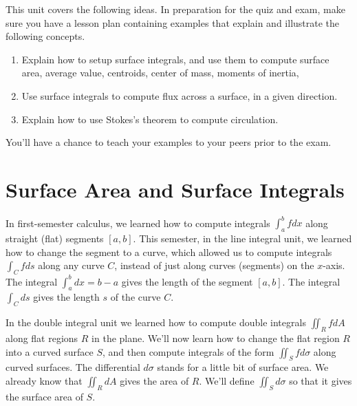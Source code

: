 
\noindent 
This unit covers the following ideas. In preparation for the quiz and exam, make sure you have a lesson plan containing examples that explain and illustrate the following concepts.  
\begin{enumerate}
\item Explain how to setup surface integrals, and use them to compute surface area, average value, centroids, center of mass, moments of inertia, 
\item Use surface integrals to compute flux across a surface, in a given direction. 
\item Explain how to use Stokes's theorem to compute circulation. 
\end{enumerate}
You'll have a chance to teach your examples to your peers prior to the exam.



\section{Surface Area and Surface Integrals}

In first-semester calculus, we learned how to compute integrals $\int_a^b f dx$ along straight (flat) segments $[a,b]$. This semester, in the line integral unit, we learned how to change the segment to a curve, which allowed us to compute integrals $\int_C fds$ along any curve $C$, instead of just along curves (segments) on the $x$-axis. The integral $\int_a^b dx=b-a$ gives the length of the segment $[a,b]$. The integral $\int_C ds$ gives the length $s$ of the curve $C$.  

In the double integral unit we learned how to compute double integrals $\iint_R fdA$ along flat regions $R$ in the plane. We'll now learn how to change the flat region $R$ into a curved surface $S$, and then compute integrals of the form $\iint_S fd\sigma$ along curved surfaces. The differential $d\sigma$ stands for a little bit of surface area.  We already know that $\iint_R dA$ gives the area of $R$.  We'll define $\iint_S d\sigma$ so that it gives the surface area of $S$.


